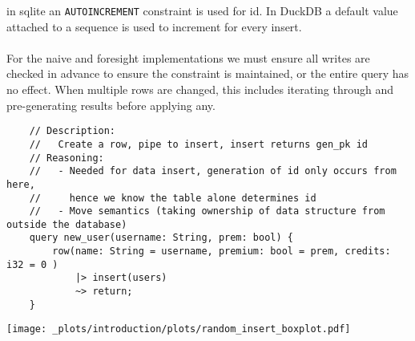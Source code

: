 in sqlite an \texttt{AUTOINCREMENT} constraint is used for id. In DuckDB a default value
attached to a sequence is used to increment for every insert.
\\
\\ For the naive and foresight implementations we must ensure all writes are checked in advance to ensure the constraint is maintained, or the entire query has no effect.
When multiple rows are changed, this includes iterating through and pre-generating results before applying any.
\begin{verbatim}
    // Description:
    //   Create a row, pipe to insert, insert returns gen_pk id
    // Reasoning:
    //   - Needed for data insert, generation of id only occurs from here,
    //     hence we know the table alone determines id
    //   - Move semantics (taking ownership of data structure from outside the database)
    query new_user(username: String, prem: bool) {
        row(name: String = username, premium: bool = prem, credits: i32 = 0 )
            |> insert(users)
            ~> return;
    }
\end{verbatim}
\begin{center}
    \texttt{[image: \_plots/introduction/plots/random\_insert\_boxplot.pdf]}
\end{center}

